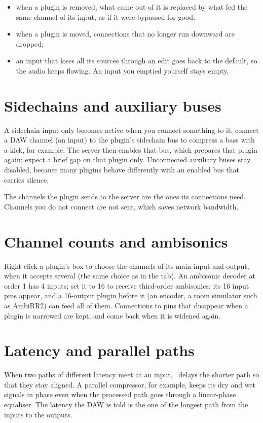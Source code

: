 \begin{itemize}
  \item when a plugin is removed, what came out of it is replaced by what
    fed the same channel of its input, as if it were bypassed for good;
  \item when a plugin is moved, connections that no longer run downward are
    dropped;
  \item an input that loses all its sources through an edit goes back to the
    default, so the audio keeps flowing. An input you emptied yourself
    stays empty.
\end{itemize}

\section{Sidechains and auxiliary buses}

A sidechain input only becomes active when you connect something to it:
connect a DAW channel (an input) to the plugin's sidechain bus to compress a
bass with a kick, for example. The server then enables that bus, which
prepares that plugin again; expect a brief gap on that plugin only.
Unconnected auxiliary buses stay disabled, because many plugins behave
differently with an enabled bus that carries silence.

The channels the plugin sends to the server are the ones its connections
need. Channels you do not connect are not sent, which saves network
bandwidth.

\section{Channel counts and ambisonics}

Right-click a plugin's box to choose the channels of its main input and
output, when it accepts several (the same choice as in the
 tab). An ambisonic decoder at order 1 has 4 inputs; set
it to 16 to receive third-order ambisonics: its 16 input pins appear, and
a 16-output plugin before it (an encoder, a room simulator such as
AmbiRR2) can feed all of them. Connections to pins that disappear when a
plugin is narrowed are kept, and come back when it is widened again.

\section{Latency and parallel paths}

When two paths of different latency meet at an input, \fxme\ delays the
shorter path so that they stay aligned. A parallel compressor, for example,
keeps its dry and wet signals in phase even when the processed path goes
through a linear-phase equaliser. The latency the DAW is told is the one of
the longest path from the inputs to the outputs.

